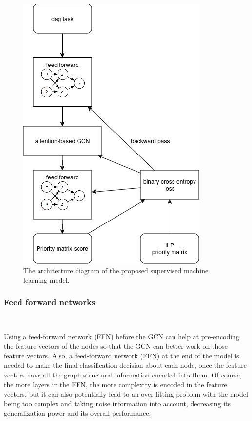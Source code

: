 \begin{figure}
    \centering
    \includegraphics[width=\linewidth]{images/designed_model.png}
    \caption{The architecture diagram of the proposed supervised machine learning model.}
    \label{fig:model_diagram}
\end{figure}

\subsubsection{Feed forward networks}
~

Using a feed-forward network (FFN) before the GCN can help at pre-encoding the feature vectors of the nodes
so that the GCN can better work on those feature vectors.
Also, a feed-forward network (FFN) at the end of the model is needed to make 
the final classification decision about each node, once the feature vectors have
all the graph structural information encoded into them.
Of course, the more layers in the FFN, the more complexity
is encoded in the feature vectors, but it can also potentially lead to an over-fitting
problem with the model being too complex and taking noise information into account,
decreasing its generalization power and its overall performance.

